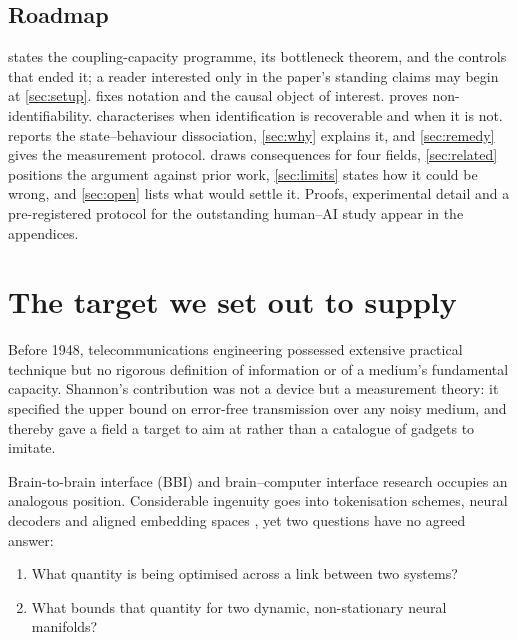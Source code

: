 \documentclass[11pt,a4paper]{article}
\theoremstyle{plain}
\theoremstyle{definition}
\theoremstyle{remark}
\begin{document}
\subsection{Roadmap}
 states the coupling-capacity programme, its bottleneck theorem, and the
controls that ended it; a reader interested only in the paper's standing claims may begin at
\cref{sec:setup}.  fixes notation and the causal object of interest.
 proves non-identifiability.  characterises when identification is
recoverable and when it is not.  reports the state--behaviour
dissociation, \cref{sec:why} explains it, and \cref{sec:remedy} gives the measurement
protocol.  draws consequences for four fields, \cref{sec:related}
positions the argument against prior work, \cref{sec:limits} states how it could be wrong,
and \cref{sec:open} lists what would settle it. Proofs, experimental detail and a
pre-registered protocol for the outstanding human--AI study appear in the appendices.

\section{The target we set out to supply}\label{sec:attempt}

Before 1948, telecommunications engineering possessed extensive practical technique but no
rigorous definition of information or of a medium's fundamental capacity. Shannon's
contribution \citep{shannon1948mathematical} was not a device but a measurement theory: it
specified the upper bound on error-free transmission over any noisy medium, and thereby gave
a field a target to aim at rather than a catalogue of gadgets to imitate.

Brain-to-brain interface (BBI) and brain--computer interface research occupies an analogous
position. Considerable ingenuity goes into tokenisation schemes, neural decoders and aligned
embedding spaces \citep{pais2013brain, rao2014direct, jiang2019brainnet, thual2022aligning},
yet two questions have no agreed answer:

\begin{enumerate}[label=(\alph*), leftmargin=1.9em, itemsep=2pt]
    \item What quantity is being optimised across a link between two systems?
    \item What bounds that quantity for two dynamic, non-stationary neural manifolds?
\end{enumerate}
\end{document}
